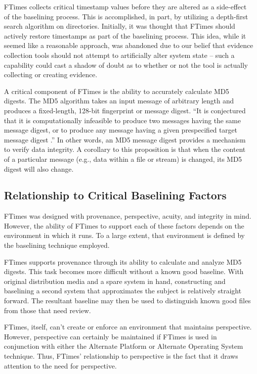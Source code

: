 \documentclass[10pt]{article}
\begin{document}
FTimes collects critical timestamp values before they are altered
as a side-effect of the baselining process.  This is accomplished, in
part, by utilizing a depth-first search algorithm on directories.
Initially, it was thought that FTimes should actively restore
timestamps as part of the baselining process.  This idea, while it
seemed like a reasonable approach, was abandoned due to our belief
that evidence collection tools should not attempt to artificially
alter system state -- such a capability could cast a shadow of doubt as
to whether or not the tool is actually collecting or creating
evidence.

A critical component of FTimes is the ability to accurately calculate
MD5 digests.  The MD5 algorithm takes an input message of arbitrary
length and produces a fixed-length, 128-bit fingerprint or message
digest.  ``It is conjectured that it is computationally infeasible
to produce two messages having the same message digest, or to
produce any message having a given prespecified target message
digest \cite{md5}.''  In other words, an MD5 message digest provides
a mechanism to verify data integrity.  A corollary to this proposition
is that when the content of a particular message (e.g., data within
a file or stream) is changed, its MD5 digest will also change.

\subsection{Relationship to Critical Baselining Factors}

FTimes was designed with provenance, perspective, acuity, and
integrity in mind.  However, the ability of FTimes to support each
of these factors depends on the environment in which it runs.  To
a large extent, that environment is defined by the baselining
technique employed.

FTimes supports provenance through its ability to calculate and
analyze MD5 digests.  This task becomes more difficult without a
known good baseline.  With original distribution media and a spare
system in hand, constructing and baselining a second system that
approximates the subject is relatively straight forward.  The
resultant baseline may then be used to distinguish known good files
from those that need review.

FTimes, itself, can't create or enforce an environment that maintains
perspective.  However, perspective can certainly be maintained if
FTimes is used in conjunction with either the Alternate Platform
or Alternate Operating System technique.  Thus, FTimes' relationship
to perspective is the fact that it draws attention to the need for
perspective.
\end{document}
